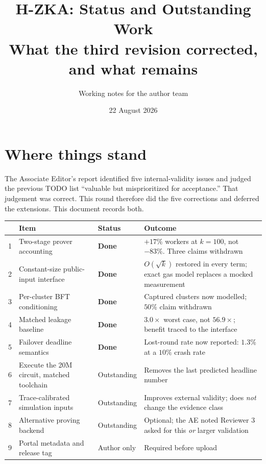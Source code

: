 \documentclass[11pt,a4paper]{article}
\title{\textbf{H-ZKA: Status and Outstanding Work}\\[0.3em]
\large What the third revision corrected, and what remains}
\author{Working notes for the author team}
\date{22 August 2026}
\begin{document}
\maketitle

\section*{Where things stand}

The Associate Editor's report identified five internal-validity issues and
judged the previous TODO list ``valuable but misprioritized for acceptance.''
That judgement was correct. This round therefore did the five corrections and
deferred the extensions. This document records both.

\vspace{0.4em}
\begin{tabularx}{\textwidth}{@{}p{0.5cm}>{\raggedright\arraybackslash}p{5.0cm}p{2.1cm}>{\raggedright\arraybackslash}X@{}}
\toprule
& \textbf{Item} & \textbf{Status} & \textbf{Outcome} \\
\midrule
1 & Two-stage prover accounting & \textcolor{donegreen}{\textbf{Done}} &
$+17\%$ workers at $k=100$, not $-83\%$. Three claims withdrawn \\
2 & Constant-size public-input interface & \textcolor{donegreen}{\textbf{Done}} &
$O(\sqrt k)$ restored in every term; exact gas model replaces a mocked
measurement \\
3 & Per-cluster BFT conditioning & \textcolor{donegreen}{\textbf{Done}} &
Captured clusters now modelled; $50\%$ claim withdrawn \\
4 & Matched leakage baseline & \textcolor{donegreen}{\textbf{Done}} &
$3.0\times$ worst case, not $56.9\times$; benefit traced to the interface \\
5 & Failover deadline semantics & \textcolor{donegreen}{\textbf{Done}} &
Lost-round rate now reported: $1.3\%$ at a $10\%$ crash rate \\
\midrule
6 & Execute the 20M circuit, matched toolchain & Outstanding &
Removes the last predicted headline number \\
7 & Trace-calibrated simulation inputs & Outstanding &
Improves external validity; does \emph{not} change the evidence class \\
8 & Alternative proving backend & Outstanding &
Optional; the AE noted Reviewer 3 asked for this \emph{or} larger validation \\
9 & Portal metadata and release tag & Author only & Required before upload \\
\bottomrule
\end{tabularx}
\end{document}
